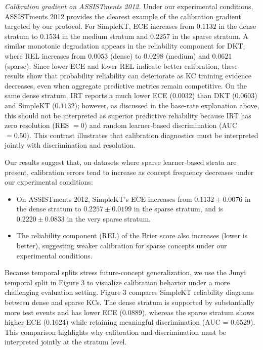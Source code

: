 \textit{Calibration gradient on ASSISTments 2012.}
Under our experimental conditions, ASSISTments 2012 provides the clearest example of the calibration gradient targeted by our protocol. For SimpleKT, ECE increases from $0.1132$ in the dense stratum to $0.1534$ in the medium stratum and $0.2257$ in the sparse stratum. A similar monotonic degradation appears in the reliability component for DKT, where REL increases from $0.0053$ (dense) to $0.0298$ (medium) and $0.0621$ (sparse). Since lower ECE and lower REL indicate better calibration, these results show that probability reliability can deteriorate as KC training evidence decreases, even when aggregate predictive metrics remain competitive. On the same dense stratum, IRT reports a much lower ECE ($0.0032$) than DKT ($0.0603$) and SimpleKT ($0.1132$); however, as discussed in the base-rate explanation above, this should not be interpreted as superior predictive reliability because IRT has zero resolution (RES $=0$) and random learner-based discrimination (AUC $=0.50$). This contrast illustrates that calibration diagnostics must be interpreted jointly with discrimination and resolution.

Our results suggest that, on datasets where sparse learner-based strata are present, calibration errors tend to increase as concept frequency decreases under our experimental conditions:
\begin{itemize}
    \item On ASSISTments 2012, SimpleKT's ECE increases from $0.1132 \pm 0.0076$ in the dense stratum to $0.2257 \pm 0.0199$ in the sparse stratum, and is $0.2220 \pm 0.0833$ in the very sparse stratum.
    \item The reliability component (REL) of the Brier score also increases (lower is better), suggesting weaker calibration for sparse concepts under our experimental conditions.
\end{itemize}

Because temporal splits stress future-concept generalization, we use the Junyi temporal split in Figure 3 to visualize calibration behavior under a more challenging evaluation setting. Figure 3 compares SimpleKT reliability diagrams between dense and sparse KCs. The dense stratum is supported by substantially more test events and has lower ECE (0.0889), whereas the sparse stratum shows higher ECE (0.1624) while retaining meaningful discrimination (AUC = 0.6529). This comparison highlights why calibration and discrimination must be interpreted jointly at the stratum level.

